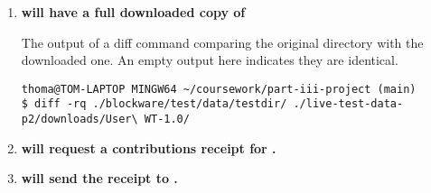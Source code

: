 \begin{enumerate}[itemsep=2.5pt]
  \item \textbf{ will have a full downloaded copy of }
  
  The output of a diff command comparing the original directory with the downloaded one. An empty output here indicates they are identical.

\begin{lstlisting}[breaklines=true, postbreak=\mbox{\textcolor{red}{$\hookrightarrow$}\space}]
thoma@TOM-LAPTOP MINGW64 ~/coursework/part-iii-project (main)
$ diff -rq ./blockware/test/data/testdir/ ./live-test-data-p2/downloads/User\ WT-1.0/

\end{lstlisting}

  \item \textbf{ will request a contributions receipt for .}

  \item \textbf{ will send the receipt to .}
\end{enumerate}

\begin{lstlisting}[breaklines=true, postbreak=\mbox{\textcolor{red}{$\hookrightarrow$}\space}]
  
\end{lstlisting}